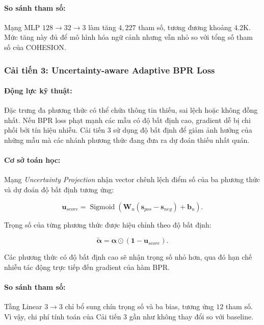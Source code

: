 \paragraph{So sánh tham số:}
Mạng MLP $128\rightarrow32\rightarrow3$ làm tăng $4{,}227$ tham số, tương đương khoảng $4.2$K. Mức tăng này đủ để mô hình hóa ngữ cảnh nhưng vẫn nhỏ so với tổng số tham số của COHESION.

\subsubsection{Cải tiến 3: Uncertainty-aware Adaptive BPR Loss}

\paragraph{Động lực kỹ thuật:}
Đặc trưng đa phương thức có thể chứa thông tin thiếu, sai lệch hoặc không đồng nhất. Nếu BPR loss phạt mạnh các mẫu có độ bất định cao, gradient dễ bị chi phối bởi tín hiệu nhiễu. Cải tiến 3 sử dụng độ bất định để giảm ảnh hưởng của những mẫu mà các nhánh phương thức đang đưa ra dự đoán thiếu nhất quán.

\paragraph{Cơ sở toán học:}
Mạng \textit{Uncertainty Projection} nhận vector chênh lệch điểm số của ba phương thức và dự đoán độ bất định tương ứng:

\begin{equation}
\mathbf{u}_{score}
=\operatorname{Sigmoid}\!\left(
\mathbf{W}_{u}(\mathbf{s}_{pos}-\mathbf{s}_{neg})+\mathbf{b}_{u}
\right).
\end{equation}

Trọng số của từng phương thức được hiệu chỉnh theo độ bất định:

\begin{equation}
\widetilde{\boldsymbol{\alpha}}
=\boldsymbol{\alpha}\odot(\mathbf{1}-\mathbf{u}_{score}).
\end{equation}

Các phương thức có độ bất định cao sẽ nhận trọng số nhỏ hơn, qua đó hạn chế nhiễu tác động trực tiếp đến gradient của hàm BPR.

\paragraph{So sánh tham số:}
Tầng Linear $3\rightarrow3$ chỉ bổ sung chín trọng số và ba bias, tương ứng $12$ tham số. Vì vậy, chi phí tính toán của Cải tiến 3 gần như không thay đổi so với baseline.

